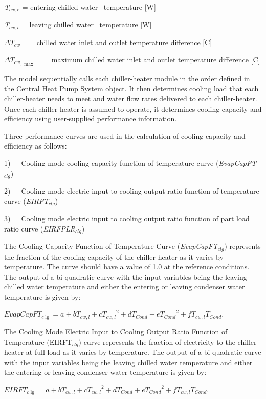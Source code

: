 \emph{T\(_{cw,e}\)} = entering chilled water~ temperature {[}W{]}

\emph{T\(_{cw,l}\)} = leaving chilled water~ temperature {[}W{]}

\(\Delta {T_{cw}}\) ~ = chilled water inlet and outlet temperature difference {[}C{]}

\(\Delta {T_{cw}}_{,\max }\) ~ = maximum chilled water inlet and outlet temperature difference {[}C{]}

The model sequentially calls each chiller-heater module in the order defined in the Central Heat Pump System object. It then determines cooling load that each chiller-heater needs to meet and water flow rates delivered to each chiller-heater. Once each chiller-heater is assumed to operate, it determines cooling capacity and efficiency using user-supplied performance information.

Three performance curves are used in the calculation of cooling capacity and efficiency as follows:

1)~~~Cooling mode cooling capacity function of temperature curve (\emph{EvapCapFT\(_{clg}\)})

2)~~~Cooling mode electric input to cooling output ratio function of temperature curve (\emph{EIRFT\(_{clg}\)})

3)~~~Cooling mode electric input to cooling output ratio function of part load ratio curve (\emph{EIRFPLR\(_{clg}\)})

The Cooling Capacity Function of Temperature Curve (\emph{EvapCapFT\(_{clg}\)}) represents the fraction of the cooling capacity of the chiller-heater as it varies by temperature. The curve should have a value of 1.0 at the reference conditions. The output of a bi-quadratic curve with the input variables being the leaving chilled water temperature and either the entering or leaving condenser water temperature is given by:

\textbf{\emph{\(EvapCapF{T_{c\lg }} = a + b{T_{cw,l}} + c{T_{cw,l}}^2 + d{T_{Cond}} + e{T_{Cond}}^2 + f{T_{cw,l}}{T_{Cond}}\)}}.

The Cooling Mode Electric Input to Cooling Output Ratio Function of Temperature (EIRFT\(_{clg}\)) curve represents the fraction of electricity to the chiller-heater at full load as it varies by temperature. The output of a bi-quadratic curve with the input variables being the leaving chilled water temperature and either the entering or leaving condenser water temperature is given by:

\textbf{\emph{\(EIRF{T_{c\lg }} = a + b{T_{cw,l}} + c{T_{cw,l}}^2 + d{T_{Cond}} + e{T_{Cond}}^2 + f{T_{cw,l}}{T_{Cond}}\)}}.


